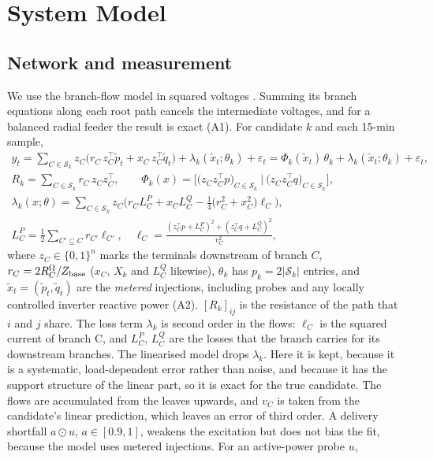 \documentclass[journal,onecolumn,11pt]{IEEEtran}
\newcommand{\tp}{^{\top}}
\begin{document}
\section{System Model}

\subsection{Network and measurement}
We use the branch-flow model in squared voltages \cite{baran1989}. Summing its branch equations along each root path cancels the intermediate voltages, and for a balanced radial feeder the result is exact (A1). For candidate $k$ and each 15-min sample,
\begin{equation}\label{eq:model}
\begin{gathered}
y_t=\sum_{C\in\mathcal S_k} z_C\big(r_C\,z_C\tp\tilde p_t+x_C\,z_C\tp\tilde q_t\big)+\lambda_k(\tilde x_t;\theta_k)+\varepsilon_t
=\Phi_k(\tilde x_t)\,\theta_k+\lambda_k(\tilde x_t;\theta_k)+\varepsilon_t,\\
R_k=\sum_{C\in\mathcal S_k}r_C\,z_Cz_C\tp,\qquad
\Phi_k(x)=\Big[\big(z_Cz_C\tp p\big)_{C\in\mathcal S_k}\ \Big|\ \big(z_Cz_C\tp q\big)_{C\in\mathcal S_k}\Big],\\
\lambda_k(x;\theta)=\sum_{C\in\mathcal S_k}z_C\Big(r_CL^P_C+x_CL^Q_C-\tfrac14\big(r_C^2+x_C^2\big)\ell_C\Big),\\
L^P_C=\tfrac12\!\!\sum_{C'\subseteq C}\!r_{C'}\ell_{C'},\quad
\ell_C=\frac{(z_C\tp p+L^P_C)^2+(z_C\tp q+L^Q_C)^2}{v_C^2},
\end{gathered}
\end{equation}
where $z_C\in\{0,1\}^n$ marks the terminals downstream of branch $C$, $r_C=2R_C^{\Omega}/Z_{\rm base}$ ($x_C$, $X_k$ and $L^Q_C$ likewise), $\theta_k$ has $p_k=2|\mathcal S_k|$ entries, and $\tilde x_t=(\tilde p_t,\tilde q_t)$ are the \emph{metered} injections, including probes and any locally controlled inverter reactive power (A2). $[R_k]_{ij}$ is the resistance of the path that $i$ and $j$ share. The loss term $\lambda_k$ is second order in the flows: $\ell_C$ is the squared current of branch C, and $L^P_C$, $L^Q_C$ are the losses that the branch carries for its downstream branches. The linearised model drops $\lambda_k$. Here it is kept, because it is a systematic, load-dependent error rather than noise, and because it has the support structure of the linear part, so it is exact for the true candidate. The flows are accumulated from the leaves upwards, and $v_C$ is taken from the candidate's linear prediction, which leaves an error of third order. A delivery shortfall $a\odot u$, $a\in[0.9,1]$, weakens the excitation but does not bias the fit, because the model uses metered injections. For an active-power probe $u$,
\end{document}
